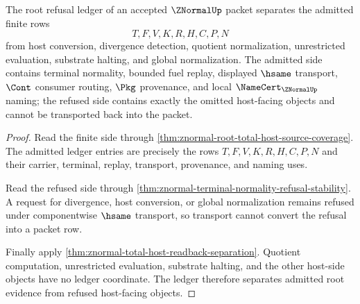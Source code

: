 \begin{theorem}
\label{thm:znormal-root-refusal-ledger-separation}
The root refusal ledger of an accepted $\ZNormalUp$ packet separates the admitted finite rows
$$
T,F,V,K,R,H,C,P,N
$$
from host conversion, divergence detection, quotient normalization, unrestricted evaluation, substrate halting, and global normalization. The admitted side contains terminal normality, bounded fuel replay, displayed $\hsame$ transport, $\Cont$ consumer routing, $\Pkg$ provenance, and local $\NameCert_{\ZNormalUp}$ naming; the refused side contains exactly the omitted host-facing objects and cannot be transported back into the packet.
\end{theorem}
\begin{proof}
Read the finite side through \autoref{thm:znormal-root-total-host-source-coverage}. The admitted ledger entries are precisely the rows $T,F,V,K,R,H,C,P,N$ and their carrier, terminal, replay, transport, provenance, and naming uses.

Read the refused side through \autoref{thm:znormal-terminal-normality-refusal-stability}. A request for divergence, host conversion, or global normalization remains refused under componentwise $\hsame$ transport, so transport cannot convert the refusal into a packet row.

Finally apply \autoref{thm:znormal-total-host-readback-separation}. Quotient computation, unrestricted evaluation, substrate halting, and the other host-side objects have no ledger coordinate. The ledger therefore separates admitted root evidence from refused host-facing objects.
\end{proof}

